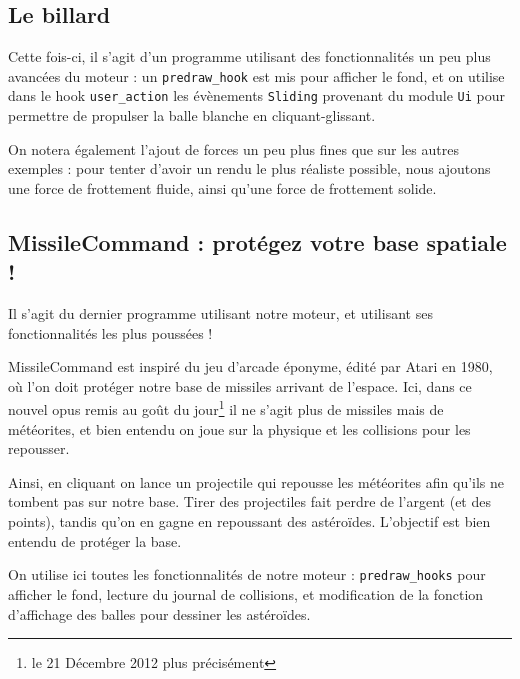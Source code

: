 \documentclass[a4paper]{scrartcl}
\begin{document}
\subsection{Le billard}

Cette fois-ci, il s'agit d'un programme utilisant des fonctionnalités
un peu plus avancées du moteur : un \texttt{predraw\_hook} est mis
pour afficher le fond, et on utilise dans le hook
\texttt{user\_action} les évènements \texttt{Sliding} provenant du
module \texttt{Ui} pour permettre de propulser la balle blanche en
cliquant-glissant.

On notera également l'ajout de forces un peu plus fines que sur les
autres exemples : pour tenter d'avoir un rendu le plus réaliste
possible, nous ajoutons une force de frottement fluide, ainsi qu'une
force de frottement solide.

\subsection{MissileCommand : protégez votre base spatiale !}

Il s'agit du dernier programme utilisant notre moteur, et utilisant
ses fonctionnalités les plus poussées !

MissileCommand est inspiré du jeu d'arcade éponyme, édité par Atari en
1980, où l'on doit protéger notre base de missiles arrivant de
l'espace. Ici, dans ce nouvel opus remis au goût du jour\footnote{le
  21 Décembre 2012 plus précisément} il ne s'agit plus de missiles
mais de météorites, et bien entendu on joue sur la physique et les
collisions pour les repousser.

Ainsi, en cliquant on lance un projectile qui repousse les météorites
afin qu'ils ne tombent pas sur notre base. Tirer des projectiles fait
perdre de l'argent (et des points), tandis qu'on en gagne en
repoussant des astéroïdes. L'objectif est bien entendu de protéger la
base.

On utilise ici toutes les fonctionnalités de notre moteur :
\texttt{predraw\_hooks} pour afficher le fond, lecture du journal de
collisions, et modification de la fonction d'affichage des balles pour
dessiner les astéroïdes.
\end{document}
